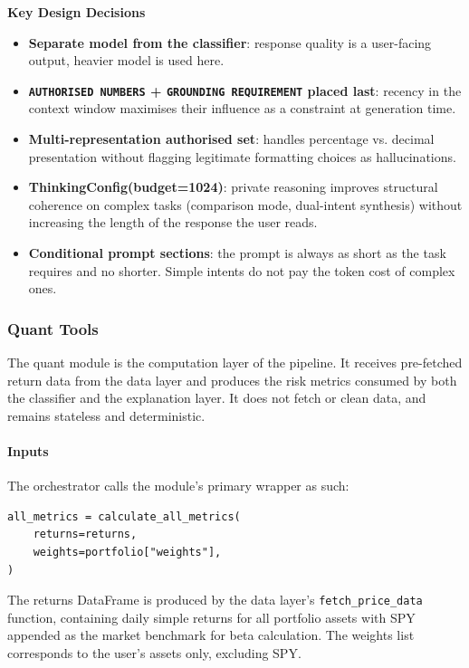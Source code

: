 \textbf{Key Design Decisions}
\begin{itemize}
    \item \textbf{Separate model from the classifier}: response quality is a user-facing output, heavier model is used here.
    \item \textbf{\texttt{AUTHORISED NUMBERS} + \texttt{GROUNDING REQUIREMENT} placed last}: recency in the context window maximises their influence as a constraint at generation time.
    \item \textbf{Multi-representation authorised set}: handles percentage vs. decimal presentation without flagging legitimate formatting choices as hallucinations.
    \item \textbf{ThinkingConfig(budget=1024)}: private reasoning improves structural coherence on complex tasks (comparison mode, dual-intent synthesis) without increasing the length of the response the user reads.
    \item \textbf{Conditional prompt sections}: the prompt is always as short as the task requires and no shorter. Simple intents do not pay the token cost of complex ones.
\end{itemize}




\subsubsection{Quant Tools}
The quant module is the computation layer of the pipeline. It receives pre-fetched return data from the data layer and produces the risk metrics consumed by both the classifier and the explanation layer. It does not fetch or clean data, and remains stateless and deterministic.

\paragraph{Inputs}

The orchestrator calls the module’s primary wrapper as such:

\begin{lstlisting}
all_metrics = calculate_all_metrics(
    returns=returns,
    weights=portfolio["weights"],
)
\end{lstlisting}

The returns DataFrame is produced by the data layer's \texttt{fetch\_price\_data} function, containing daily simple returns for all portfolio assets with SPY appended as the market benchmark for beta calculation. The weights list corresponds to the user's assets only, excluding SPY.

